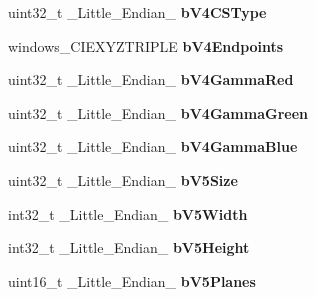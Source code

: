 \begin{DoxyCompactItemize}
\item 
\hypertarget{structGCC__ATTRIBUTE_aa912a03732087a660f776c7608a524c3}{uint32\-\_\-t \-\_\-\-Little\-\_\-\-Endian\-\_\- {\bfseries b\-V4\-C\-S\-Type}}\label{structGCC__ATTRIBUTE_aa912a03732087a660f776c7608a524c3}

\item 
\hypertarget{structGCC__ATTRIBUTE_a4f1cff005a84e4513364418353ca7fae}{windows\-\_\-\-C\-I\-E\-X\-Y\-Z\-T\-R\-I\-P\-L\-E {\bfseries b\-V4\-Endpoints}}\label{structGCC__ATTRIBUTE_a4f1cff005a84e4513364418353ca7fae}

\item 
\hypertarget{structGCC__ATTRIBUTE_a5b833edc9187987fead30bce386e323d}{uint32\-\_\-t \-\_\-\-Little\-\_\-\-Endian\-\_\- {\bfseries b\-V4\-Gamma\-Red}}\label{structGCC__ATTRIBUTE_a5b833edc9187987fead30bce386e323d}

\item 
\hypertarget{structGCC__ATTRIBUTE_a2ef4451640769ca5af225b9966fb0c3a}{uint32\-\_\-t \-\_\-\-Little\-\_\-\-Endian\-\_\- {\bfseries b\-V4\-Gamma\-Green}}\label{structGCC__ATTRIBUTE_a2ef4451640769ca5af225b9966fb0c3a}

\item 
\hypertarget{structGCC__ATTRIBUTE_af14ff260e75e6e3a2684649b49c9ba5d}{uint32\-\_\-t \-\_\-\-Little\-\_\-\-Endian\-\_\- {\bfseries b\-V4\-Gamma\-Blue}}\label{structGCC__ATTRIBUTE_af14ff260e75e6e3a2684649b49c9ba5d}

\item 
\hypertarget{structGCC__ATTRIBUTE_a0177e9bd99dfaf231aa40bb75eae995d}{uint32\-\_\-t \-\_\-\-Little\-\_\-\-Endian\-\_\- {\bfseries b\-V5\-Size}}\label{structGCC__ATTRIBUTE_a0177e9bd99dfaf231aa40bb75eae995d}

\item 
\hypertarget{structGCC__ATTRIBUTE_af36fdbd6567b26e9d6faa578a42ebe3c}{int32\-\_\-t \-\_\-\-Little\-\_\-\-Endian\-\_\- {\bfseries b\-V5\-Width}}\label{structGCC__ATTRIBUTE_af36fdbd6567b26e9d6faa578a42ebe3c}

\item 
\hypertarget{structGCC__ATTRIBUTE_af6341c7a55fa6b486499f581093ee119}{int32\-\_\-t \-\_\-\-Little\-\_\-\-Endian\-\_\- {\bfseries b\-V5\-Height}}\label{structGCC__ATTRIBUTE_af6341c7a55fa6b486499f581093ee119}

\item 
\hypertarget{structGCC__ATTRIBUTE_a17977888d8db36faaf50b75a8c267da4}{uint16\-\_\-t \-\_\-\-Little\-\_\-\-Endian\-\_\- {\bfseries b\-V5\-Planes}}\label{structGCC__ATTRIBUTE_a17977888d8db36faaf50b75a8c267da4}


\end{DoxyCompactItemize}
